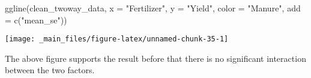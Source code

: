 \documentclass[
]{book}
\newenvironment{Shaded}{\begin{snugshade}}{\end{snugshade}}
\newcommand{\AttributeTok}[1]{\textcolor[rgb]{0.77,0.63,0.00}{#1}}
\newcommand{\FunctionTok}[1]{\textcolor[rgb]{0.00,0.00,0.00}{#1}}
\newcommand{\NormalTok}[1]{#1}
\newcommand{\StringTok}[1]{\textcolor[rgb]{0.31,0.60,0.02}{#1}}
\begin{document}
\begin{Shaded}
\begin{Highlighting}[]
\FunctionTok{ggline}\NormalTok{(clean\_twoway\_data,}
       \AttributeTok{x =} \StringTok{"Fertilizer"}\NormalTok{,}
       \AttributeTok{y =} \StringTok{"Yield"}\NormalTok{,}
       \AttributeTok{color =} \StringTok{"Manure"}\NormalTok{,}
       \AttributeTok{add =} \FunctionTok{c}\NormalTok{(}\StringTok{"mean\_se"}\NormalTok{))}
\end{Highlighting}
\end{Shaded}

\begin{center}\texttt{[image: \_main\_files/figure-latex/unnamed-chunk-35-1]} \end{center}

The above figure supports the result before that there is no significant interaction between the two factors.

  
\end{document}
